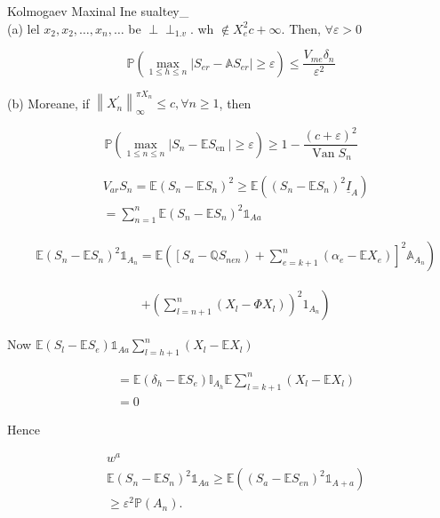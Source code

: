 \documentclass{amsbook}
\theoremstyle{plain}%
\theoremstyle{definition}
\theoremstyle{remark}
\def\Perp{\perp\!\!\!\perp}
\begin{document}
  Kolmogaev Maxinal Ine sualtey\_\\
  (a) lel $x_{2}, x_{2}, \ldots, x_{n}, \ldots$ be $\Perp_{1 . v}$. wh $\notin X_{e}^{2} c+\infty$. Then, $\forall \varepsilon>0$

  $$
  \mathbb{P}\left(\max _{1 \leq h \leq n}\left|S_{e r}-\mathbb{A} S_{e r}\right| \geqslant \varepsilon\right) \leqslant \frac{V_{m e} \delta_{n}}{\varepsilon^{2}}
  $$

  (b) Moreane, if $\left\|X_{n}^{\prime}\right\|_{\infty}^{\pi X_{n}} \leq c, \forall n \geqslant 1$, then

  $$
  \mathbb{P}\left(\max _{1 \leqslant n \leqslant n}\left|S_{n}-\mathbb{E} S_{\text {en }}\right| \geqslant \varepsilon\right) \geqslant 1-\frac{(c+\varepsilon)^{2}}{\operatorname{Van} S_{n}}
  $$

  $$
  \begin{aligned}
    & V_{a r} S_{n}=\mathbb{E}\left(S_{n}-\mathbb{E} S_{n}\right)^{2} \geqslant \mathbb{E}\left(\left(S_{n}-\mathbb{E} S_{n}\right)^{2} \underline{I}_{A}\right) \\
    & =\sum_{n=1}^{n} \mathbb{E}\left(S_{n}-\mathbb{E} S_{n}\right)^{2} \mathbb{1}_{A a}
  \end{aligned}
  $$

  $$
  \begin{aligned}
  & \left.\mathbb{E}\left(S_{n}-\mathbb{E} S_{n}\right)^{2} \mathbb{1}_{A_{n}}=\mathbb{E}\left(\left[S_{a}-\mathbb{Q} S_{n e n}\right)+\sum_{e=k+1}^{n}\left(\alpha_{e}-\mathbb{E} X_{e}\right)\right]^{2} \mathbb{A}_{A_{n}}\right)
\end{aligned}
$$

$$
\begin{aligned}
& \left.+\left(\sum_{l=n+1}^{n}\left(X_{l}-\Phi X_{l}\right)\right)^{2} 1_{A_{n}}\right)
\end{aligned}
$$

Now $\mathbb{E}\left(S_{l}-\mathbb{E} S_{e}\right) \mathbb{1}_{A a} \sum_{l=h+1}^{n}\left(X_{l}-\mathbb{E} X_{l}\right)$

$$
\begin{aligned}
& =\mathbb{E}\left(\delta_{h}-\mathbb{E} S_{e}\right) \mathbb{I}_{A_{h}} \mathbb{E} \sum_{l=k+1}^{n}\left(X_{l}-\mathbb{E} X_{l}\right) \\
& =0
\end{aligned}
$$

Hence

$$
\begin{aligned}
& w^{a}                                                                                                                                                          \\
& \mathbb{E}\left(S_{n}-\mathbb{E} S_{n}\right)^{2} \mathbb{1}_{A a} \geqslant \mathbb{E}\left(\left(S_{a}-\mathbb{E} S_{e n}\right)^{2} \mathbb{1}_{A+a}\right) \\
& \geqslant \varepsilon^{2} \mathbb{P}\left(A_{n}\right) .
\end{aligned}
$$
\end{document}
